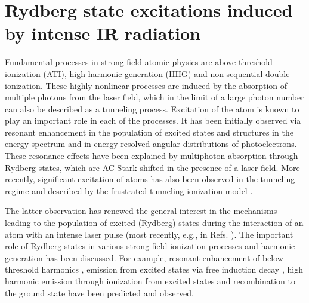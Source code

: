 \chapter{Rydberg state excitations induced by intense IR radiation} %
\label{cha:rydberg_state_excitations}

Fundamental processes in strong-field atomic physics are above-threshold ionization (ATI), high harmonic generation (HHG) and non-sequential double ionization. These highly nonlinear processes are induced by the absorption of multiple photons from the laser field, which in the limit of a large photon number can also be described as a tunneling process. Excitation of the atom is known to play an important role in each of the processes. It has been initially observed via resonant enhancement in the population of excited states \cite{deboer1992,jones1992} and structures in the energy spectrum \cite{freeman1987,perry1989,agostini1989} and in energy-resolved angular distributions \cite{rottke1994} of photoelectrons. These resonance effects have been explained by multiphoton absorption through Rydberg states, which are AC-Stark shifted in the presence of a laser field. More recently, significant excitation of atoms has also been observed in the tunneling regime and described by the frustrated tunneling ionization model .  

The latter observation has renewed the general interest in the mechanisms leading to the population of excited (Rydberg) states during the interaction of an atom with an intense laser pulse (most recently, e.g., in Refs. \cite{chini2014,li2014,li2014b,zimmermann2015,shao2015,camp2015,li2015,fechner2015,bredtmann2016,fushitani2016,lv2016,serebryannikov2016,hart2016,li2016,xiong2016,beaulieu2016,larimian2016,zimmermann2017,bengtsson2017,gao2017,ivanov2017,ilchen2017,mancuso2017,xiong2017,piraux2017}). The important role of Rydberg states in various strong-field ionization processes and harmonic generation has been discussed. For example, resonant enhancement of below-threshold harmonics \cite{toma1999,chini2014,camp2015}, emission from excited states via free induction decay \cite{camp2015,beaulieu2016}, high harmonic emission through ionization from excited states and recombination to the ground state \cite{bian2010,beaulieu2016} have been predicted and observed.

